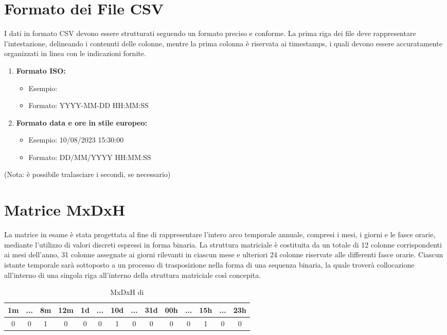 \documentclass{rapportECL}
\begin{document}
\section{Formato dei File CSV}

I dati in formato CSV devono essere strutturati seguendo un formato preciso e conforme. 
La prima riga dei file deve rappresentare l'intestazione, delineando i contenuti delle colonne, mentre la prima colonna è riservata ai timestamps, 
i quali devono essere accuratamente organizzati in linea con le indicazioni fornite.
\begin{enumerate} 
  \item \textbf{Formato ISO:}
  \begin{itemize}
    \item Esempio:  
    \item Formato: YYYY-MM-DD HH:MM:SS
  \end{itemize}
  \item \textbf{Formato data e ore in stile europeo:}
  \begin{itemize}
    \item Esempio: 10/08/2023 15:30:00
    \item Formato: DD/MM/YYYY HH:MM:SS
  \end{itemize} 
\end{enumerate}

(Nota: è possibile tralasciare i secondi, se necessario)

\section{Matrice MxDxH}

La matrice in esame è stata progettata al fine di rappresentare l'intero arco temporale annuale, compresi i mesi, i giorni e le fasce orarie, 
mediante l'utilizzo di valori discreti espressi in forma binaria. 
La struttura matriciale è costituita da un totale di 12 colonne corrispondenti ai mesi dell'anno, 31 colonne assegnate 
ai giorni rilevanti in ciascun mese e ulteriori 24 colonne riservate alle differenti fasce orarie. 
Ciascun istante temporale sarà sottoposto a un processo di trasposizione nella forma di una sequenza binaria, 
la quale troverà collocazione all'interno di una singola riga all'interno della struttura matriciale così concepita.
 
\begin{table}[h]\centering
  \begin{tabular}{|*{14}{c|}}
  
  \hline
  1m & ... & 8m & 12m & 1d & ... & 10d & ... & 31d & 00h & ... & 15h & ... & 23h\\
  \hline
  0 & 0 & 1 & 0 & 0 & 0 & 1 & 0 & 0 & 0 & 0 & 1 & 0 & 0\\
  \hline
  
  \end{tabular}
  
  \caption{MxDxH di  }
\end{table}
\end{document}
